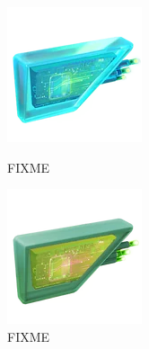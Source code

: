 \begin{figure}[h]
\begin{minipage}[t]{0.3\textwidth}
\begin{center}
    \includegraphics[width=\textwidth]{images/rainylure.png}
    \end{center}
    \caption*{FIXME}
    \label{fig:FIXME}
  \end{minipage}
  \begin{minipage}[t]{0.3\textwidth}
    \begin{center}
    \includegraphics[width=\textwidth]{images/mossylure.png}
    \end{center}
    \caption*{FIXME}
    \label{fig:FIXME}
  \end{minipage}
\end{figure}
